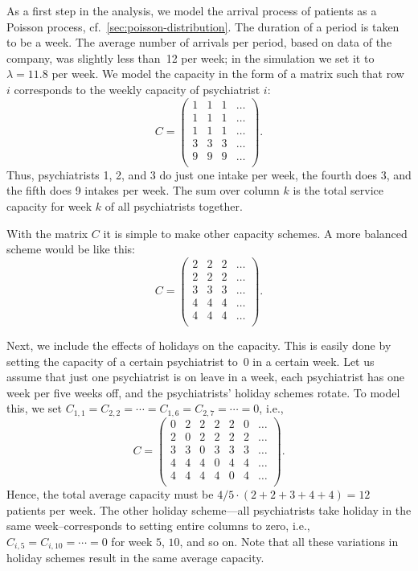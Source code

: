 As a first step in the analysis, we model the arrival process of patients as a Poisson process, cf.~\cref{sec:poisson-distribution}.
The duration of a period is taken to be a week.
The average number of arrivals per period, based on data of the company, was slightly less than~12 per week; in the simulation we set it to $\lambda= 11.8$ per week.
We model the capacity in the form of a matrix such that row $i$ corresponds to the weekly capacity of psychiatrist $i$:
\begin{equation*}
C = 
 \begin{pmatrix}
 1 & 1 & 1 & \ldots\\
 1 & 1 & 1 & \ldots\\
 1 & 1 & 1 & \ldots\\
 3 & 3 & 3 & \ldots\\
 9 & 9 & 9 & \ldots\\
 \end{pmatrix}.
\end{equation*}
Thus, psychiatrists 1, 2, and 3 do just one intake per week, the
fourth does 3, and the fifth does 9 intakes per week. The sum over
column $k$ is the total service capacity for week $k$ of all
psychiatrists together.

With the matrix $C$ it is simple to make other capacity schemes. A
more balanced scheme would be like this:
\begin{equation*}
C = 
 \begin{pmatrix}
 2 & 2 & 2 & \ldots\\
 2 & 2 & 2 & \ldots\\
 3 & 3 & 3 & \ldots\\
 4 & 4 & 4 & \ldots\\
 4 & 4 & 4 & \ldots\\
 \end{pmatrix}.
\end{equation*}

Next, we include the effects of holidays on the capacity. This is
easily done by setting the capacity of a certain psychiatrist to~$0$ in
a certain week. Let us assume that just one psychiatrist is on leave in
a week, each psychiatrist has one week per five weeks off, and the
psychiatrists' holiday schemes rotate. To model this, we set
$C_{1,1}=C_{2,2}=\cdots=C_{1,6}=C_{2,7} =\cdots = 0$, i.e.,
\begin{equation*}
C = 
 \begin{pmatrix}
 0 & 2 & 2 & 2 & 2 & 0 & \ldots \\
 2 & 0 & 2 & 2 & 2 & 2 & \ldots\\
 3 & 3 & 0 & 3 & 3 & 3 & \ldots\\
 4 & 4 & 4 & 0 & 4 & 4 & \ldots\\
 4 & 4 & 4 & 4 & 0 & 4 & \ldots\\
 \end{pmatrix}.
\end{equation*}
Hence, the total average capacity must be $4/5 \cdot (2+2+3+4+4) = 12$
patients per week. The other holiday scheme---all psychiatrists take
holiday in the same week--corresponds to setting entire columns to
zero, i.e., $C_{i,5}=C_{i,10}=\cdots=0$ for week $5$, $10$, and so
on. Note that all these variations in holiday schemes result in the
same average capacity.


